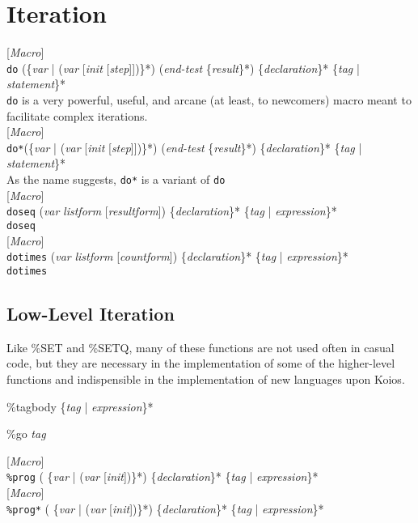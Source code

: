 \documentclass[10pt]{book}
\newenvironment{defother}[2]{[\textit{#1}]\\\texttt{#2}}{\\}
\newenvironment{defmacro}[1]{\begin{defother}{Macro}{#1}}{\end{defother}}
\newenvironment{special-form}[1]{\begin{defother}{Special form}{#1}}{\end{defother}}
\begin{document}
\section{Iteration}
\begin{defmacro}{do} (\{\textit{var} | (\textit{var} [\textit{init} [\textit{step}]])\}*) (\textit{end-test} \{\textit{result}\}*) \{\textit{declaration}\}* \{\textit{tag} | \textit{statement}\}*\\
\texttt{do} is a very powerful, useful, and arcane (at least, to newcomers) macro meant to facilitate complex iterations.
\end{defmacro}
\begin{defmacro}{do*}(\{\textit{var} | (\textit{var} [\textit{init} [\textit{step}]])\}*) (\textit{end-test} \{\textit{result}\}*) \{\textit{declaration}\}* \{\textit{tag} | \textit{statement}\}*\\
As the name suggests, \texttt{do*} is a variant of \texttt{do}
\end{defmacro}
\begin{defmacro}{doseq} (\textit{var} \textit{listform} [\textit{resultform}]) \{\textit{declaration}\}* \{\textit{tag} | \textit{expression}\}*\\ \texttt{doseq} \end{defmacro}
\begin{defmacro}{dotimes} (\textit{var} \textit{listform} [\textit{countform}]) \{\textit{declaration}\}* \{\textit{tag} | \textit{expression}\}*\\ \texttt{dotimes}\end{defmacro}
\subsection{Low-Level Iteration}
Like \%SET and \%SETQ, many of these functions are not used often in casual code, but they are necessary in the implementation of some of the higher-level functions and indispensible in the implementation of new languages upon Koios.\\
\begin{special-form}{\%tagbody} \{\textit{tag} | \textit{expression}\}*\end{special-form}
\begin{special-form}{\%go} \textit{tag}\end{special-form}

\begin{defmacro}{\%prog} ( \{\textit{var} | (\textit{var} [\textit{init}])\}*) \{\textit{declaration}\}* \{\textit{tag} | \textit{expression}\}*\end{defmacro}
\begin{defmacro}{\%prog*} ( \{\textit{var} | (\textit{var} [\textit{init}])\}*) \{\textit{declaration}\}* \{\textit{tag} | \textit{expression}\}*\end{defmacro}
\end{document}
